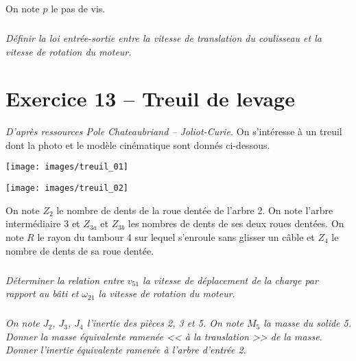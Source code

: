 \documentclass[10pt,fleqn]{article} %
\begin{document}
\begin{multicols}{2}
\begin{multicols}{2}
On note $p$ le pas de vis. 
\fi


\subparagraph{}
\textit{Définir la loi entrée-sortie entre la vitesse de translation du coulisseau et la vitesse de rotation du moteur. }
\ifprof
\begin{corrige}
\end{corrige}
\else
\fi


\section*{Exercice 13 -- Treuil de levage}
\textit{D'après ressources Pole Chateaubriand -- Joliot-Curie.}
\setcounter{exo}{0}
\ifprof
\else
On s’intéresse à un treuil dont la photo et le modèle cinématique sont donnés ci-dessous.
\begin{center}
\texttt{[image: images/treuil\_01]}
\end{center}

\begin{center}
\texttt{[image: images/treuil\_02]}
\end{center}

On note $Z_2$ le nombre de dents de la roue dentée de l'arbre 2. On note l'arbre intermédiaire 3 et $Z_{3a}$ et $Z_{3b}$ les nombres de dents de ses deux roues dentées. On note $R$ le rayon du tambour 4 sur lequel s’enroule sans glisser un câble et $Z_4$ le nombre de dents de sa roue dentée.

\fi

\subparagraph{}
\textit{Déterminer la relation entre $v_{51}$ la vitesse de déplacement de la charge par rapport au bâti et $\omega_{21}$ la vitesse de rotation du moteur.}
\ifprof
\begin{corrige}
\end{corrige}
\else
\fi


\subparagraph{}
\textit{On note $J_2$, $J_3$, $J_4$ l'inertie des pièces 2, 3 et 5. On note $M_5$ la masse du solide 5. Donner la masse équivalente ramenée << à la translation >> de la masse. Donner l'inertie équivalente ramenée à l'arbre d'entrée 2.  }
\ifprof
\begin{corrige}
\end{corrige}
\else
\fi


\ifprof
\end{multicols}
\else
\end{multicols}
\fi
\end{document}

